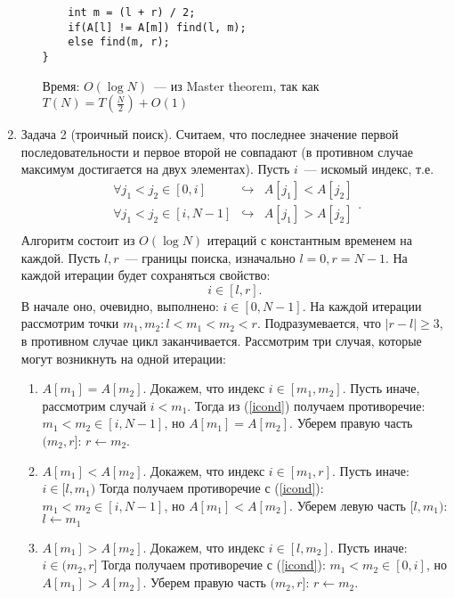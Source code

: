 \documentclass[a4paper]{article}
\begin{document}
\begin{enumerate}
\begin{enumerate}
\begin{verbatim}
    int m = (l + r) / 2;
    if(A[l] != A[m]) find(l, m);
    else find(m, r);
}
\end{verbatim}
Время: $O(\log N)$~--- из Master theorem, так как $T(N)=T(\frac{N}{2})+O(1)$
\end{enumerate}
\item Задача 2 (троичный поиск). Считаем, что последнее значение первой последовательности и первое второй не совпадают (в противном случае максимум достигается на двух элементах). Пусть $i$~--- искомый индекс, т.е. \begin{equation}\begin{array}{lcr}\label{icond}\forall j_1<j_2\in[0,i] & \hookrightarrow & A[j_1]<A[j_2]\\
\forall j_1<j_2\in[i,N-1] & \hookrightarrow & A[j_1]>A[j_2]\\\end{array}.\end{equation} Алгоритм состоит из $O(\log N)$ итераций с константным временем на каждой. Пусть $l,r$~--- границы поиска, изначально $l=0, r=N-1$. На каждой итерации будет сохраняться свойство: \begin{equation}\label{lrcond}i\in [l,r].\end{equation} В начале оно, очевидно, выполнено: $i\in[0,N-1]$. На каждой итерации рассмотрим точки $m_1,m_2:l<m_1<m_2<r$. Подразумевается, что $|r-l|\geq 3$, в противном случае цикл заканчивается.\newline
Рассмотрим три случая, которые могут возникнуть на одной итерации:
\begin{enumerate}
\item $A[m_1]=A[m_2]$. Докажем, что индекс $i\in[m_1,m_2]$. Пусть иначе, рассмотрим случай $i<m_1$. Тогда из (\ref{icond}) получаем противоречие: $m_1<m_2\in[i,N-1]$, но $A[m_1]=A[m_2]$.\newline
Уберем правую часть $(m_2,r]$: $r\leftarrow m_2$.
\item $A[m_1]<A[m_2]$. Докажем, что индекс $i\in[m_1,r]$. Пусть иначе: $i\in[l,m_1)$ Тогда получаем противоречие с (\ref{icond}): $m_1<m_2\in[i,N-1]$, но $A[m_1]<A[m_2]$.\newline
Уберем левую часть $[l,m_1)$: $l\leftarrow m_1$
\item $A[m_1]>A[m_2]$. Докажем, что индекс $i\in[l,m_2]$. Пусть иначе: $i\in(m_2,r]$ Тогда получаем противоречие с (\ref{icond}): $m_1<m_2\in[0,i]$, но $A[m_1]>A[m_2]$.\newline
Уберем правую часть $(m_2,r]$: $r\leftarrow m_2$.
\end{enumerate}

\end{enumerate}
\end{document}

